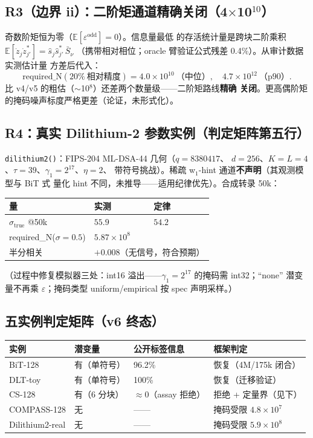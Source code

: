 \documentclass[11pt,a4paper]{ctexart}
\begin{document}
\subsection{R3（边界 ii）：二阶矩通道精确关闭（4$\times$10$^{10}$）}

奇数阶矩恒为零（$\mathbb{E}[\varepsilon^{\text{odd}}]=0$）。信息量最低
的存活统计量是跨块二阶乘积
$\mathbb{E}[\dot z_j\dot z_{j'}^*]=\hat s_j\hat s_{j'}^*\,\bar S_\nu$
（携带相对相位；oracle 臂验证公式残差 0.4\%）。从审计数据实测估计量
方差后代入：
\[
\text{required\_N}(20\%\ \text{相对精度}) = 4.0\times10^{10}\ \text{（中位）},\quad
4.7\times10^{12}\ \text{（p90）}.
\]
比 v4/v5 的粗估（$\sim$10$^8$）还差两个数量级——二阶矩路线\textbf{精确
关闭}。更高偶阶矩的掩码噪声标度严格更差（论证，未形式化）。

\subsection{R4：真实 Dilithium-2 参数实例（判定矩阵第五行）}

\texttt{dilithium2()}：FIPS-204 ML-DSA-44 几何（$q{=}8380417$、
$d{=}256$、$K{=}L{=}4$、$\tau{=}39$、$\gamma_1{=}2^{17}$、$\eta{=}2$、
带符号挑战）。稀疏 w$_1$-hint 通道\textbf{不声明}（其观测模型与 BiT 式
量化 hint 不同，未推导——适用纪律优先）。合成转录 50k：

\begin{table}[htbp]\centering\small
\begin{tabular}{@{}lll@{}}
\toprule
量 & 实测 & 定律 \\
\midrule
$\sigma_{\mathrm{true}}$ @50k & $55.9$ & $54.2$ \\
required\_N($\sigma{=}0.5$) & \multicolumn{2}{l}{$5.87\times10^8$} \\
半分相关 & \multicolumn{2}{l}{$+0.008$（无信号，符合预期）} \\
\bottomrule
\end{tabular}
\end{table}

（过程中修复模拟器三处：int16 溢出——$\gamma_1{=}2^{17}$ 的掩码需
int32；``none'' 潜变量不再乘 $\varepsilon$；掩码类型
uniform/empirical 按 spec 声明采样。）

\subsection{五实例判定矩阵（v6 终态）}

\begin{table}[htbp]\centering\small
\begin{tabular}{@{}llll@{}}
\toprule
实例 & 潜变量 & 公开标签信息 & 框架判定 \\
\midrule
BiT-128 & 有（单符号） & 96.2\% & 恢复（4M/175k 闭合） \\
DLT-toy & 有（单符号） & 100\% & 恢复（迁移验证） \\
CS-128 & 有（6 分块） & $\approx$0（assay 拒绝） & 拒绝 + 定量界（见下） \\
COMPASS-128 & 无 & —— & 掩码受限 $4.8\times10^7$ \\
Dilithium2-real & 无 & —— & 掩码受限 $5.9\times10^8$ \\
\bottomrule
\end{tabular}
\end{table}
\end{document}
